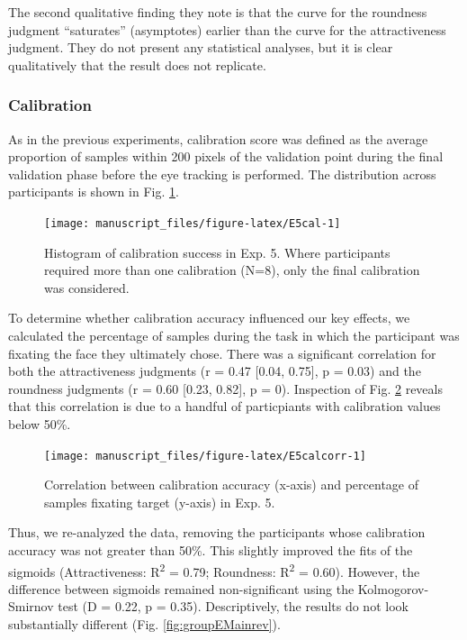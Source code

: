 \documentclass[
  man,floatsintext]{apa6}
\begin{document}
The second qualitative finding they note is that the curve for the roundness judgment ``saturates'' (asymptotes) earlier than the curve for the attractiveness judgment. They do not present any statistical analyses, but it is clear qualitatively that the result does not replicate.

\hypertarget{calibration-4}{%
\subsubsection{Calibration}\label{calibration-4}}

As in the previous experiments, calibration score was defined as the average proportion of samples within 200 pixels of the validation point during the final validation phase before the eye tracking is performed. The distribution across participants is shown in Fig. \ref{fig:E5cal}.


\begin{figure}
\texttt{[image: manuscript\_files/figure-latex/E5cal-1]} \caption{Histogram of calibration success in Exp. 5. Where participants required more than one calibration (N=8), only the final calibration was considered.}\label{fig:E5cal}
\end{figure}

To determine whether calibration accuracy influenced our key effects, we calculated the percentage of samples during the task in which the participant was fixating the face they ultimately chose. There was a significant correlation for both the attractiveness judgments (r = 0.47 {[}0.04, 0.75{]}, p = 0.03) and the roundness judgments (r = 0.60 {[}0.23, 0.82{]}, p = 0). Inspection of Fig. \ref{fig:E5calcorr} reveals that this correlation is due to a handful of particpiants with calibration values below 50\%.



\begin{figure}
\texttt{[image: manuscript\_files/figure-latex/E5calcorr-1]} \caption{Correlation between calibration accuracy (x-axis) and percentage of samples fixating target (y-axis) in Exp. 5.}\label{fig:E5calcorr}
\end{figure}

Thus, we re-analyzed the data, removing the participants whose calibration accuracy was not greater than 50\%. This slightly improved the fits of the sigmoids (Attractiveness: R\textsuperscript{2} = 0.79; Roundness: R\textsuperscript{2} = 0.60). However, the difference between sigmoids remained non-significant using the Kolmogorov-Smirnov test (D = 0.22, p = 0.35). Descriptively, the results do not look substantially different (Fig. \ref{fig:groupEMainrev}).
\end{document}
